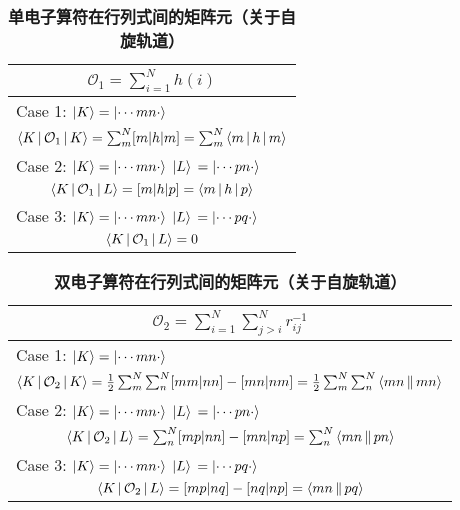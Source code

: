 \begin{table}[h]
	\renewcommand\arraystretch{1.7}
	\centering
	\caption{\bf 单电子算符在行列式间的矩阵元（关于自旋轨道）}
	\label{t2.3}
	\begin{tabularx}{\textwidth}{lY}
		\hline
		 \\\hline
		Case 1: $\Ket{K}=\Ket{\cdots mn\cdot}$&\\
		\\
		Case 2: \parbox[t]{.5\textwidth}{
		$\Ket{K}=\Ket{\cdots mn\cdot}$\\
		$\Ket{L}\,=\Ket{\cdots pn\cdot}$
			}&	\\
		\\
		Case 3: \parbox[t]{5cm}{
			$\Ket{K}=\Ket{\cdots mn\cdot}$\\
			$\Ket{L}\,=\Ket{\cdots pq\cdot}$}& \\
		\\\hline
		
	\end{tabularx}
\end{table}

\begin{table}[h]
	\renewcommand\arraystretch{1.7}
	\centering
	\caption{\bf 双电子算符在行列式间的矩阵元（关于自旋轨道）}
	\label{t2.4}
	\begin{tabularx}{\textwidth}{lY}
		\hline
		\\\hline
		Case 1: $\Ket{K}=\Ket{\cdots mn\cdot}$&\\
		\\
		Case 2: \parbox[t]{5cm}{
			$\Ket{K}=\Ket{\cdots mn\cdot}$\\
			$\Ket{L}\,=\Ket{\cdots pn\cdot}$
		}	&\\
		\\
		Case 3: \parbox[t]{5cm}{
			$\Ket{K}=\Ket{\cdots mn\cdot}$\\
			$\Ket{L}\,=\Ket{\cdots pq\cdot}$}&\\
		\\\hline
	\end{tabularx}
\end{table}

